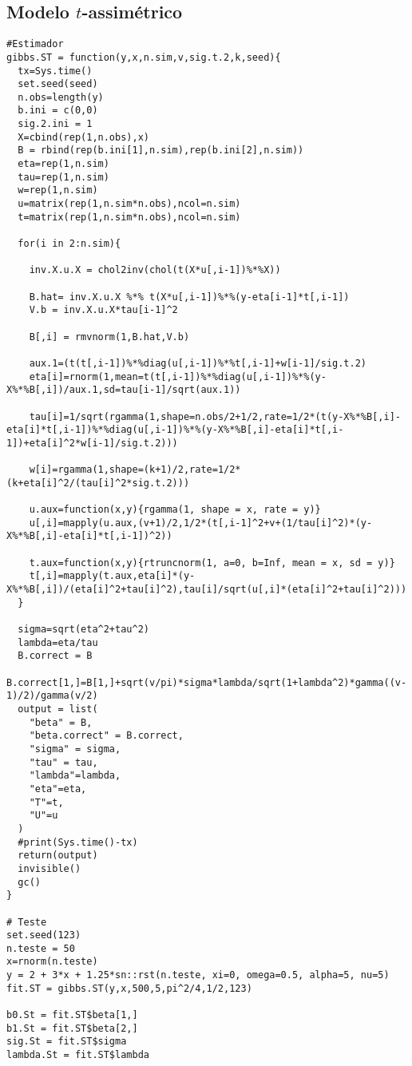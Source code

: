 \subsection{Modelo $t$-assimétrico}
\begin{lstlisting}
#Estimador
gibbs.ST = function(y,x,n.sim,v,sig.t.2,k,seed){
  tx=Sys.time()
  set.seed(seed)
  n.obs=length(y)
  b.ini = c(0,0)
  sig.2.ini = 1
  X=cbind(rep(1,n.obs),x)
  B = rbind(rep(b.ini[1],n.sim),rep(b.ini[2],n.sim))
  eta=rep(1,n.sim)
  tau=rep(1,n.sim)
  w=rep(1,n.sim)
  u=matrix(rep(1,n.sim*n.obs),ncol=n.sim)
  t=matrix(rep(1,n.sim*n.obs),ncol=n.sim)
  
  for(i in 2:n.sim){
    
    inv.X.u.X = chol2inv(chol(t(X*u[,i-1])%*%X))
    
    B.hat= inv.X.u.X %*% t(X*u[,i-1])%*%(y-eta[i-1]*t[,i-1])
    V.b = inv.X.u.X*tau[i-1]^2
    
    B[,i] = rmvnorm(1,B.hat,V.b)
    
    aux.1=(t(t[,i-1])%*%diag(u[,i-1])%*%t[,i-1]+w[i-1]/sig.t.2)
    eta[i]=rnorm(1,mean=t(t[,i-1])%*%diag(u[,i-1])%*%(y-X%*%B[,i])/aux.1,sd=tau[i-1]/sqrt(aux.1))
    
    tau[i]=1/sqrt(rgamma(1,shape=n.obs/2+1/2,rate=1/2*(t(y-X%*%B[,i]-eta[i]*t[,i-1])%*%diag(u[,i-1])%*%(y-X%*%B[,i]-eta[i]*t[,i-1])+eta[i]^2*w[i-1]/sig.t.2)))
    
    w[i]=rgamma(1,shape=(k+1)/2,rate=1/2*(k+eta[i]^2/(tau[i]^2*sig.t.2)))
    
    u.aux=function(x,y){rgamma(1, shape = x, rate = y)}
    u[,i]=mapply(u.aux,(v+1)/2,1/2*(t[,i-1]^2+v+(1/tau[i]^2)*(y-X%*%B[,i]-eta[i]*t[,i-1])^2))
    
    t.aux=function(x,y){rtruncnorm(1, a=0, b=Inf, mean = x, sd = y)}
    t[,i]=mapply(t.aux,eta[i]*(y-X%*%B[,i])/(eta[i]^2+tau[i]^2),tau[i]/sqrt(u[,i]*(eta[i]^2+tau[i]^2)))
  }  
  
  sigma=sqrt(eta^2+tau^2)
  lambda=eta/tau
  B.correct = B
  B.correct[1,]=B[1,]+sqrt(v/pi)*sigma*lambda/sqrt(1+lambda^2)*gamma((v-1)/2)/gamma(v/2)
  output = list(
    "beta" = B,
    "beta.correct" = B.correct,
    "sigma" = sigma,
    "tau" = tau,
    "lambda"=lambda,
    "eta"=eta,
    "T"=t,
    "U"=u
  )
  #print(Sys.time()-tx)
  return(output)
  invisible()
  gc()
}

# Teste
set.seed(123)
n.teste = 50
x=rnorm(n.teste)
y = 2 + 3*x + 1.25*sn::rst(n.teste, xi=0, omega=0.5, alpha=5, nu=5)
fit.ST = gibbs.ST(y,x,500,5,pi^2/4,1/2,123)

b0.St = fit.ST$beta[1,]
b1.St = fit.ST$beta[2,]
sig.St = fit.ST$sigma
lambda.St = fit.ST$lambda
\end{lstlisting}


